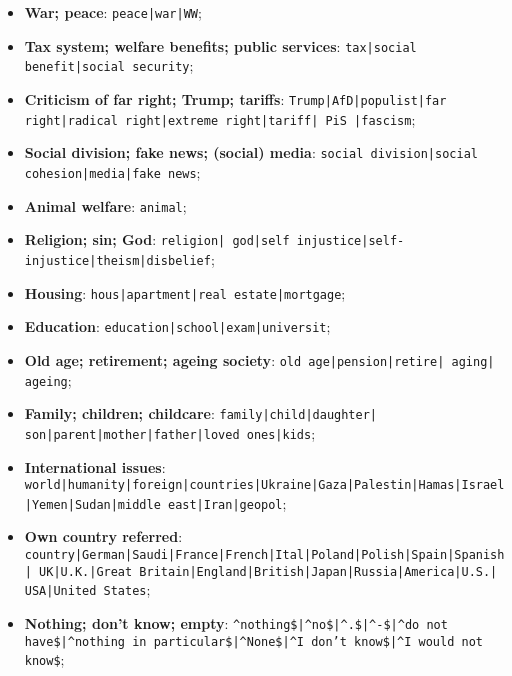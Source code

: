\begin{itemize}
 \item \textbf{War; peace}: \texttt{peace\allowbreak|war\allowbreak|WW};
 \item \textbf{Tax system; welfare benefits; public services}: \texttt{tax\allowbreak|social benefit\allowbreak|social security};
 \item \textbf{Criticism of far right; Trump; tariffs}: \texttt{Trump\allowbreak|AfD\allowbreak|populist\allowbreak|far right\allowbreak|radical right\allowbreak|extreme right\allowbreak|tariff\allowbreak| PiS \allowbreak|fascism};
 \item \textbf{Social division; fake news; (social) media}: \texttt{social division\allowbreak|social cohesion\allowbreak|media\allowbreak|fake news};
 \item \textbf{Animal welfare}: \texttt{animal};
 \item \textbf{Religion; sin; God}: \texttt{religion\allowbreak| god\allowbreak|self injustice\allowbreak|self-injustice\allowbreak|theism\allowbreak|disbelief};
 \item \textbf{Housing}: \texttt{hous\allowbreak|apartment\allowbreak|real estate\allowbreak|mortgage};
 \item \textbf{Education}: \texttt{education\allowbreak|school\allowbreak|exam\allowbreak|universit};
 \item \textbf{Old age; retirement; ageing society}: \texttt{old age\allowbreak|pension\allowbreak|retire\allowbreak| aging\allowbreak| ageing};
 \item \textbf{Family; children; childcare}: \texttt{family\allowbreak|child\allowbreak|daughter\allowbreak| son\allowbreak|parent\allowbreak|mother\allowbreak|father\allowbreak|loved ones\allowbreak|kids};
 \item \textbf{International issues}: \texttt{world\allowbreak|humanity\allowbreak|foreign\allowbreak|countries\allowbreak|Ukraine\allowbreak|Gaza\allowbreak|Palestin\allowbreak|Hamas\allowbreak|Israel\allowbreak|Yemen\allowbreak|Sudan\allowbreak|middle east\allowbreak|Iran\allowbreak|geopol};
 \item \textbf{Own country referred}: \texttt{country\allowbreak|German\allowbreak|Saudi\allowbreak|France\allowbreak|French\allowbreak|Ital\allowbreak|Poland\allowbreak|Polish\allowbreak|Spain\allowbreak|Spanish\allowbreak| UK\allowbreak|U.K.\allowbreak|Great Britain\allowbreak|England\allowbreak|British\allowbreak|Japan\allowbreak|Russia\allowbreak|America\allowbreak|U.S.\allowbreak| USA\allowbreak|United States};
 \item \textbf{Nothing; don't know; empty}: \texttt{\^{}nothing\$\allowbreak|\^{}no\$\allowbreak|\^{}.\$\allowbreak|\^{}-\$\allowbreak|\^{}do not have\$\allowbreak|\^{}nothing in particular\$\allowbreak|\^{}None\$\allowbreak|\^{}I don't know\$\allowbreak|\^{}I would not know\$};

\end{itemize}

